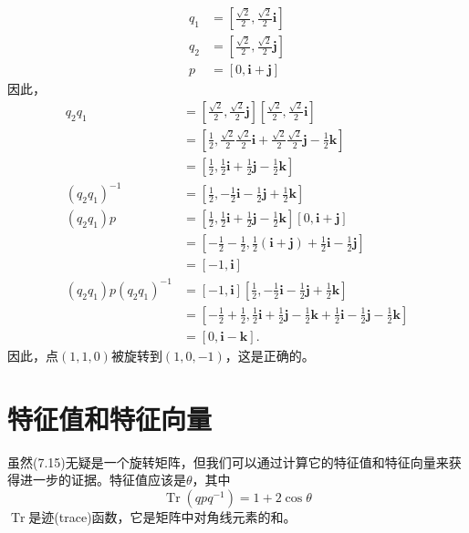 $$
\begin{aligned}
q_{1} & =\left[\frac{\sqrt{2}}{2}, \frac{\sqrt{2}}{2} \mathbf{i}\right] \\
q_{2} & =\left[\frac{\sqrt{2}}{2}, \frac{\sqrt{2}}{2} \mathbf{j}\right] \\
p & =[0, \mathbf{i}+\mathbf{j}]
\end{aligned}
$$
因此，
$$
\begin{aligned}
q_{2} q_{1} & =\left[\frac{\sqrt{2}}{2}, \frac{\sqrt{2}}{2} \mathbf{j}\right]\left[\frac{\sqrt{2}}{2}, \frac{\sqrt{2}}{2} \mathbf{i}\right] \\
& =\left[\frac{1}{2}, \frac{\sqrt{2}}{2} \frac{\sqrt{2}}{2} \mathbf{i}+\frac{\sqrt{2}}{2} \frac{\sqrt{2}}{2} \mathbf{j}-\frac{1}{2} \mathbf{k}\right] \\
& =\left[\frac{1}{2}, \frac{1}{2} \mathbf{i}+\frac{1}{2} \mathbf{j}-\frac{1}{2} \mathbf{k}\right] \\
\left(q_{2} q_{1}\right)^{-1} & =\left[\frac{1}{2},-\frac{1}{2} \mathbf{i}-\frac{1}{2} \mathbf{j}+\frac{1}{2} \mathbf{k}\right] \\
\left(q_{2} q_{1}\right) p & =\left[\frac{1}{2}, \frac{1}{2} \mathbf{i}+\frac{1}{2} \mathbf{j}-\frac{1}{2} \mathbf{k}\right][0, \mathbf{i}+\mathbf{j}] \\
& =\left[-\frac{1}{2}-\frac{1}{2}, \frac{1}{2}(\mathbf{i}+\mathbf{j})+\frac{1}{2} \mathbf{i}-\frac{1}{2} \mathbf{j}\right] \\
& =[-1, \mathbf{i}] \\
\left(q_{2} q_{1}\right) p\left(q_{2} q_{1}\right)^{-1} & =[-1, \mathbf{i}]\left[\frac{1}{2},-\frac{1}{2} \mathbf{i}-\frac{1}{2} \mathbf{j}+\frac{1}{2} \mathbf{k}\right] \\
& =\left[-\frac{1}{2}+\frac{1}{2}, \frac{1}{2} \mathbf{i}+\frac{1}{2} \mathbf{j}-\frac{1}{2} \mathbf{k}+\frac{1}{2} \mathbf{i}-\frac{1}{2} \mathbf{j}-\frac{1}{2} \mathbf{k}\right] \\
& =[0, \mathbf{i}-\mathbf{k}] .
\end{aligned}
$$
因此，点$(1,1,0)$被旋转到$(1,0,-1)$，这是正确的。

\section{特征值和特征向量}
虽然(7.15)无疑是一个旋转矩阵，但我们可以通过计算它的特征值和特征向量来获得进一步的证据。特征值应该是$\theta$，其中
$$
\operatorname{Tr}\left(q p q^{-1}\right)=1+2 \cos \theta
$$
$\operatorname{Tr}$是迹(trace)函数，它是矩阵中对角线元素的和。

